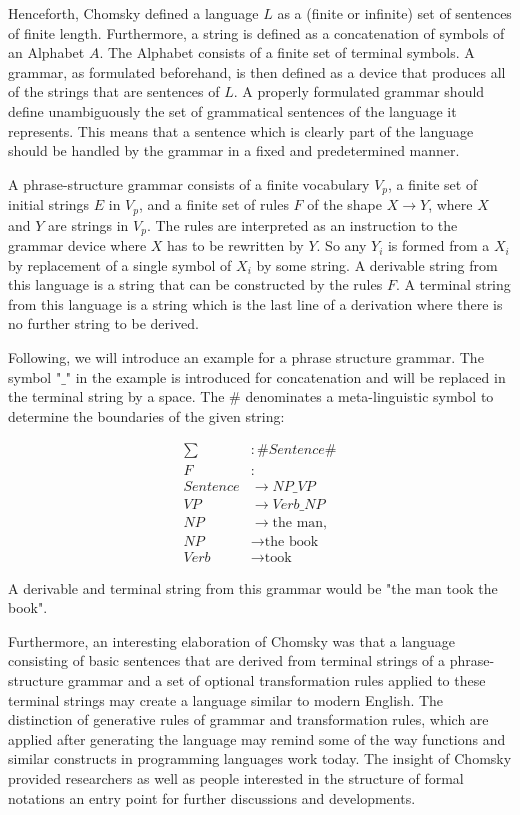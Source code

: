 \documentclass{article}
\begin{document}
Henceforth, Chomsky defined a language $L$ as a (finite or infinite) set of sentences of finite length. Furthermore, a string is defined as a concatenation of symbols of an Alphabet $A$. The Alphabet consists of a finite set of terminal symbols. A grammar, as formulated beforehand, is then defined as a device that produces all of the strings that are sentences of $L$. A properly formulated grammar should define unambiguously the set of grammatical sentences of the language it represents. This means that a sentence which is clearly part of the language should be handled by the grammar in a fixed and predetermined manner.

A phrase-structure grammar consists of a finite vocabulary $V_p$, a finite set of initial strings $E$ in $V_p$, and a finite set of rules $F$ of the shape $X \to Y$, where $X$ and $Y$ are strings in $V_p$. The rules are interpreted as an instruction to the grammar device where $X$ has to be rewritten by $Y$. So any $Y_i$ is formed from a $X_i$ by replacement of a single symbol of $X_i$ by some string. A derivable string from this language is a string that can be constructed by the rules $F$. A terminal string from this language is a string which is the last line of a derivation where there is no further string to be derived.

Following, we will introduce an example for a phrase structure grammar. The symbol "$\_$" in the example is introduced for concatenation and will be replaced in the terminal string by a space. The \# denominates a meta-linguistic symbol to determine the boundaries of the given string:

\begin{equation} \label{eq1}
	\begin{split}
		\sum &: \# Sentence \# \\
		F&: \\ Sentence &\to NP\_VP \\
		VP &\to Verb\_NP \\
		NP &\to \text{the man}, \\
		NP &\to \text{the book} \\
		Verb &\to \text{took}
	\end{split}
\end{equation}

A derivable and terminal string from this grammar would be "the man took the book".

Furthermore, an interesting elaboration of Chomsky was that a language consisting of basic sentences that are derived from terminal strings of a phrase-structure grammar and a set of optional transformation rules applied to these terminal strings may create a language similar to modern English. The distinction of generative rules of grammar and transformation rules, which are applied after generating the language may remind some of the way functions and similar constructs in programming languages work today. The insight of Chomsky provided researchers as well as people interested in the structure of formal notations an entry point for further discussions and developments.
\end{document}
